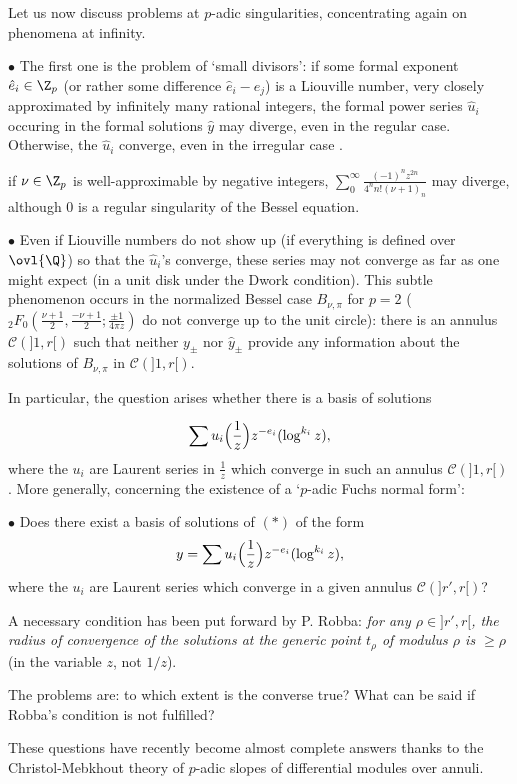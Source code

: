 \begin{para}\label{para::3.1.5} Let us now discuss problems at $p$-adic
 singularities, concentrating again on phenomena at infinity.

 \medskip\noindent $\bullet$ The first one is the problem of `small
 divisors': if some formal exponent $\hat e_i\in \Z_p$ (or rather some
 difference $\hat e_i -\hat e_j$) is a Liouville number, \ie very
 closely approximated by infinitely many rational integers, the formal
 power series $\hat u_i$ occuring in the formal solutions $\hat y$ may
 diverge, even in the regular case. Otherwise, the $\hat u_i$ 
 converge, even in the irregular case \cite{baldassarri82:_differ}.

 \medskip
  if $\nu \in \Z_p$ is well-approximable by
 negative integers, $\sum_0^\infty \frac{(-1)^n z^{2n}}{4^n n! (\nu
 +1)_n}$ may diverge, although $0$ is a regular singularity of the
 Bessel equation.

\medskip\noindent 
 $\bullet$ Even if Liouville numbers do not show up (\eg if everything
 is defined over $\ovl{\Q}$) so that the $\hat u_i$'s converge, these
 series may not converge as far as one might expect (\eg in a unit disk
 under the Dwork condition). This subtle phenomenon occurs in the
 normalized Bessel case $B_{\nu,\pi}$ for $p=2$ (${}_2F_0(\frac{\nu
 +1}{2},\frac{-\nu +1}{2}; \frac{\pm 1}{4\pi z})$ do not converge up
 to the unit circle): there is an annulus $\mathcal{C}(]1,r[)$ such that
 neither $y_\pm$ nor $\hat y_\pm$ provide any information about the
 solutions of $B_{\nu,\pi}$ in $\mathcal{C}(]1,r[)$.

 In particular, the question arises whether there is a basis of solutions 

 \begin{equation*}
  \sum{u_i}\Bigl(\frac{1}{z}\Bigr) z^{-{e}_i}(\log^{k_i} z),
 \end{equation*}
 where the ${u_i}$ are Laurent series in $\frac{1}{z}$ which converge in
 such an annulus $\mathcal{C}(]1,r[)$. More generally, concerning the
 existence of a `$p$-adic Fuchs normal form': 

 \medskip\noindent 
 $\bullet$ Does there exist a basis of solutions of $(\ast)$ of the form 
 \begin{equation*}
  y=\sum {u_i}\Bigl(\frac{1}{z}\Bigr) z^{-{e}_i} (\log^{k_i} z),
 \end{equation*}
 where the ${u_i}$ are Laurent series which converge in
 a given annulus $\mathcal{C}(]r',r[)$?

 \medskip\noindent A necessary condition has been put forward by
 P. Robba: {\it for any $\rho\in ]r',r[$, the radius of convergence of
 the solutions at the generic point $t_\rho$ of modulus $\rho$ is $\geq
 \rho$} (in the variable $z$, not $1/z$).

 The problems are: to which extent is the converse true? What can be
 said if Robba's condition is not fulfilled?

 \medskip\noindent These questions have recently become almost complete
 answers thanks to the Christol-Mebkhout theory of $p$-adic slopes of
 differential modules over annuli.  
\end{para}

